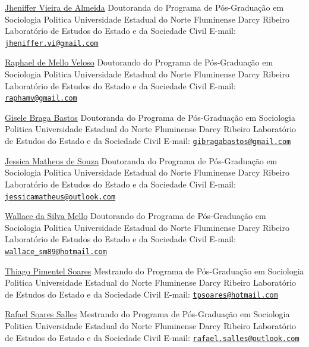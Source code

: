 \documentclass[
  12pt,
]{article}
\begin{document}
\href{http://lattes.cnpq.br/1477388811747167}{Jheniffer Vieira de
Almeida} \hfill\break Doutoranda do Programa de Pós-Graduação em
Sociologia Politica \hfill\break Universidade Estadual do Norte
Fluminense Darcy Ribeiro \hfill\break Laboratório de Estudos do Estado e
da Sociedade Civil \hfill\break E-mail:
\href{mailto:jheniffer.vi@gmail.com}{\nolinkurl{jheniffer.vi@gmail.com}}
\hfill\break

\href{http://lattes.cnpq.br/9433034841064768}{Raphael de Mello Veloso}
\hfill\break Doutorando do Programa de Pós-Graduação em Sociologia
Politica \hfill\break Universidade Estadual do Norte Fluminense Darcy
Ribeiro \hfill\break Laboratório de Estudos do Estado e da Sociedade
Civil \hfill\break E-mail:
\href{mailto:raphamv@gmail.com}{\nolinkurl{raphamv@gmail.com}}

\href{http://lattes.cnpq.br/1675744772217864}{Gisele Braga Bastos}
\hfill\break Doutoranda do Programa de Pós-Graduação em Sociologia
Politica \hfill\break Universidade Estadual do Norte Fluminense Darcy
Ribeiro \hfill\break Laboratório de Estudos do Estado e da Sociedade
Civil \hfill\break E-mail:
\href{mailto:gibragabastos@gmail.com}{\nolinkurl{gibragabastos@gmail.com}}
\hfill\break

\href{http://lattes.cnpq.br/6717255818088404}{Jessica Matheus de Souza}
\hfill\break Doutoranda do Programa de Pós-Graduação em Sociologia
Politica \hfill\break Universidade Estadual do Norte Fluminense Darcy
Ribeiro \hfill\break Laboratório de Estudos do Estado e da Sociedade
Civil \hfill\break E-mail:
\href{mailto:jessicamatheus@outlook.com}{\nolinkurl{jessicamatheus@outlook.com}}
\hfill\break

\href{http://lattes.cnpq.br/8178088513307546}{Wallace da Silva Mello}
\hfill\break Doutorando do Programa de Pós-Graduação em Sociologia
Politica \hfill\break Universidade Estadual do Norte Fluminense Darcy
Ribeiro \hfill\break Laboratório de Estudos do Estado e da Sociedade
Civil \hfill\break E-mail:
\href{mailto:wallace_sm89@hotmail.com}{\nolinkurl{wallace\_sm89@hotmail.com}}
\hfill\break

\href{http://lattes.cnpq.br/5038496684551538}{Thiago Pimentel Soares}
\hfill\break Mestrando do Programa de Pós-Graduação em Sociologia
Politica \hfill\break Universidade Estadual do Norte Fluminense Darcy
Ribeiro \hfill\break Laboratório de Estudos do Estado e da Sociedade
Civil \hfill\break E-mail:
\href{mailto:tpsoares@hotmail.com}{\nolinkurl{tpsoares@hotmail.com}}
\hfill\break

\href{http://lattes.cnpq.br/6781198318316057}{Rafael Soares Salles}
\hfill\break Mestrando do Programa de Pós-Graduação em Sociologia
Politica \hfill\break Universidade Estadual do Norte Fluminense Darcy
Ribeiro \hfill\break Laboratório de Estudos do Estado e da Sociedade
Civil \hfill\break  E-mail:
\href{mailto:rafael.salles@outlook.com}{\nolinkurl{rafael.salles@outlook.com}}
\hfill\break
\end{document}
